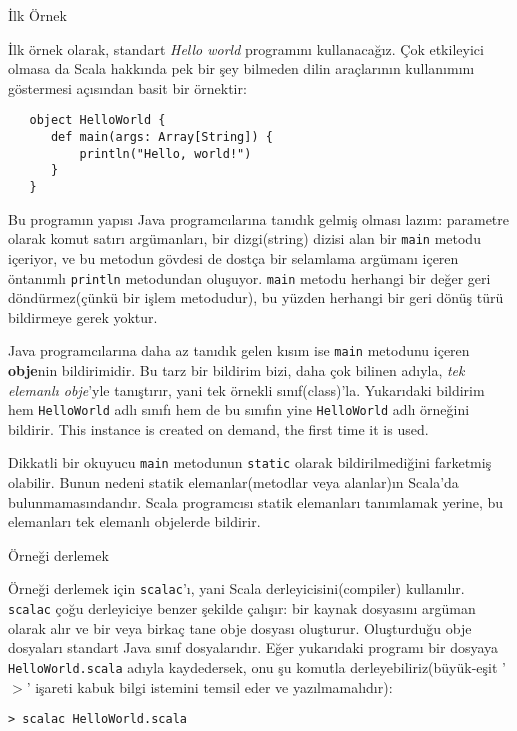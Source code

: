 \documentclass[10pt,a4paper]{book}
\begin{document}
\begin{chapter}{İlk Örnek}

İlk örnek olarak, standart \textit{Hello world} programını kullanacağız. Çok etkileyici olmasa da Scala hakkında pek bir şey bilmeden dilin araçlarının kullanımını göstermesi açısından basit bir örnektir:

\begin{verbatim}
   object HelloWorld {
      def main(args: Array[String]) {
          println("Hello, world!")
      }
   }
\end{verbatim}

Bu programın yapısı Java programcılarına tanıdık gelmiş olması lazım: parametre olarak komut satırı argümanları, bir dizgi(string) dizisi alan bir \texttt{main} metodu içeriyor, ve bu metodun gövdesi de dostça bir selamlama argümanı içeren öntanımlı \texttt{println} metodundan oluşuyor. \texttt{main} metodu herhangi bir değer geri döndürmez(çünkü bir işlem metodudur), bu yüzden herhangi bir geri dönüş türü bildirmeye gerek yoktur.

Java programcılarına daha az tanıdık gelen kısım ise \texttt{main} metodunu içeren \textbf{obje}nin bildirimidir. Bu tarz bir bildirim bizi, daha çok bilinen adıyla, \textit{tek elemanlı obje}'yle tanıştırır, yani tek örnekli sınıf(class)'la. Yukarıdaki bildirim hem \texttt{HelloWorld} adlı sınıfı hem de bu sınıfın yine \texttt{HelloWorld} adlı örneğini bildirir. This instance is created on demand, the first time it is used. 

Dikkatli bir okuyucu \texttt{main} metodunun \texttt{static} olarak bildirilmediğini farketmiş olabilir. Bunun nedeni statik elemanlar(metodlar veya alanlar)ın Scala'da bulunmamasındandır. Scala programcısı statik elemanları tanımlamak yerine, bu elemanları tek elemanlı objelerde bildirir.

\begin{section}{Örneği derlemek}

Örneği derlemek için \texttt{scalac}'ı, yani Scala derleyicisini(compiler) kullanılır. \texttt{scalac} çoğu derleyiciye benzer şekilde çalışır: bir kaynak dosyasını argüman olarak alır ve bir veya birkaç tane obje dosyası oluşturur. Oluşturduğu obje dosyaları standart Java sınıf dosyalarıdır.
Eğer yukarıdaki programı bir dosyaya \texttt{HelloWorld.scala} adıyla kaydedersek, onu şu komutla derleyebiliriz(büyük-eşit '$>$' işareti kabuk bilgi istemini temsil eder ve yazılmamalıdır):

\begin{verbatim}
> scalac HelloWorld.scala
\end{verbatim}


\end{section}
\end{chapter}
\end{document}
